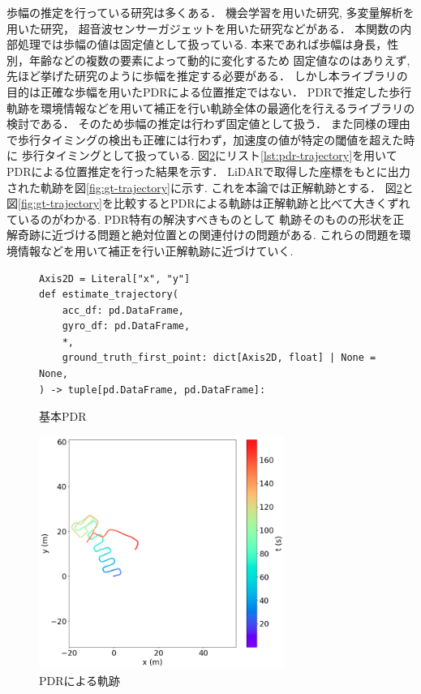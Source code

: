 \documentclass[Japanese]{dicomopapers}
\begin{document}
歩幅の推定を行っている研究は多くある．
機会学習を用いた研究\cite{stride-length-auto-learning},
多変量解析を用いた研究\cite{stride-length-multi}，
超音波センサーガジェットを用いた研究\cite{stride-length-ultrasonic}などがある．
本関数の内部処理では歩幅の値は固定値として扱っている.
本来であれば歩幅は身長，性別，年齢などの複数の要素によって動的に変化するため
固定値なのはありえず,先ほど挙げた研究のように歩幅を推定する必要がある．
しかし本ライブラリの目的は正確な歩幅を用いたPDRによる位置推定ではない．
PDRで推定した歩行軌跡を環境情報などを用いて補正を行い軌跡全体の最適化を行えるライブラリの検討である．
そのため歩幅の推定は行わず固定値として扱う．
また同様の理由で歩行タイミングの検出も正確には行わず，加速度の値が特定の閾値を超えた時に
歩行タイミングとして扱っている.
図\ref{fig:pdr}にリスト\ref{lst:pdr-trajectory}を用いてPDRによる位置推定を行った結果を示す．
LiDARで取得した座標をもとに出力された軌跡を図\ref{fig:gt-trajectory}に示す.
これを本論では正解軌跡とする．
図\ref{fig:pdr}と図\ref*{fig:gt-trajectory}を比較するとPDRによる軌跡は正解軌跡と比べて大きくずれているのがわかる.
PDR特有の解決すべきものとして
軌跡そのものの形状を正解奇跡に近づける問題と絶対位置との関連付けの問題がある.
これらの問題を環境情報などを用いて補正を行い正解軌跡に近づけていく.


\begin{figure}[ht]
	\begin{lstlisting}
Axis2D = Literal["x", "y"]
def estimate_trajectory(
    acc_df: pd.DataFrame,
    gyro_df: pd.DataFrame,
    *,
    ground_truth_first_point: dict[Axis2D, float] | None = None,
) -> tuple[pd.DataFrame, pd.DataFrame]:
\end{lstlisting}
	\caption{基本PDR}
	\label{fig:estimate-trajectory-with-ground-tooth-first-point}
\end{figure}


\begin{figure}[h]
	\centering
	\includegraphics[width=80mm]{image/pdr.jpg}
	\caption{PDRによる軌跡}    \label{fig:pdr}
\end{figure}
\end{document}
